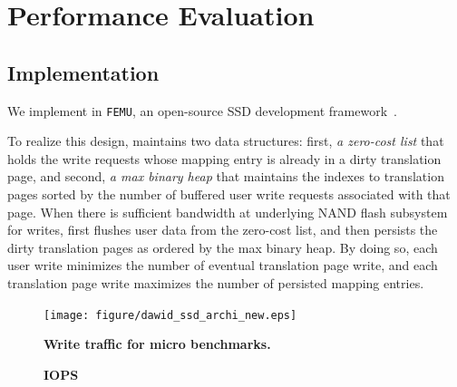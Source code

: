 \section{Performance Evaluation}


\subsection{Implementation}
We implement \ours{} in \texttt{FEMU}, an open-source SSD development
framework~\cite{li2018case}. 

To realize this design,  
\ours{} maintains two data structures: first, \textit{a zero-cost list}  
that holds the write requests whose mapping entry is already in a dirty translation page,  
and second, \textit{a max binary heap} that maintains the indexes to translation pages 
sorted by the number of buffered user write requests associated with that page.  
When there is sufficient bandwidth at underlying NAND flash subsystem for writes,  
\ours{} first flushes user data from the  zero-cost list, 
and then persists the dirty translation pages as ordered by the max binary heap.  
By doing so, each user write minimizes the number of eventual translation page write,  
and each translation page write maximizes the number of persisted mapping entries. 

\begin{figure}[t]
    \centering{}
    \texttt{[image: figure/dawid\_ssd\_archi\_new.eps]}
    \caption{\textbf{Write traffic for micro benchmarks.}}
    \label{fig_spartan_archi}
\end{figure}






\begin{figure}[t]
    \centering{}
    \caption{\textbf{IOPS}}
\end{figure} 


